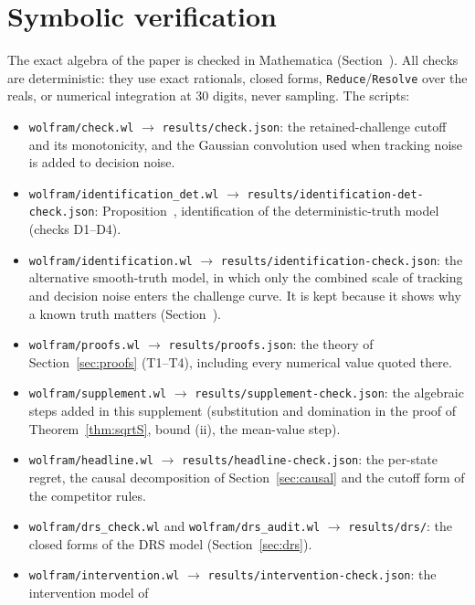 \documentclass[aoas]{imsart}
\theoremstyle{plain}
\theoremstyle{definition}
\begin{document}
\section{Symbolic verification}\label{sec:kernel}

The exact algebra of the paper is checked in Mathematica (Section~). All checks are deterministic: they use exact rationals, closed forms,
\texttt{Reduce}/\texttt{Resolve} over the reals, or numerical integration at 30 digits, never sampling. The scripts:
\begin{itemize}
\item \nolinkurl{wolfram/check.wl} $\to$ \nolinkurl{results/check.json}: the retained-challenge cutoff and its monotonicity,
and the Gaussian convolution used when tracking noise is added to decision noise.
\item \nolinkurl{wolfram/identification_det.wl} $\to$
\nolinkurl{results/identification-det-check.json}:
Proposition~, identification of the deterministic-truth model (checks D1--D4).
\item \nolinkurl{wolfram/identification.wl} $\to$ \nolinkurl{results/identification-check.json}: the alternative smooth-truth
model, in which only the combined scale of tracking and decision noise enters the challenge curve. It is kept because
it shows why a known truth matters (Section~).
\item \nolinkurl{wolfram/proofs.wl} $\to$ \nolinkurl{results/proofs.json}: the theory of Section~\ref{sec:proofs} (T1--T4),
including every numerical value quoted there.
\item \nolinkurl{wolfram/supplement.wl} $\to$ \nolinkurl{results/supplement-check.json}: the algebraic steps added in this
supplement (substitution and domination in the proof of Theorem~\ref{thm:sqrtS}, bound (ii), the mean-value step).
\item \nolinkurl{wolfram/headline.wl} $\to$ \nolinkurl{results/headline-check.json}: the per-state regret, the causal
decomposition of Section~\ref{sec:causal} and the cutoff form of the competitor rules.
\item \nolinkurl{wolfram/drs_check.wl} and \nolinkurl{wolfram/drs_audit.wl} $\to$ \nolinkurl{results/drs/}: the closed forms
of the DRS model (Section~\ref{sec:drs}).
\item \nolinkurl{wolfram/intervention.wl} $\to$ \nolinkurl{results/intervention-check.json}: the intervention model of

\end{itemize}
\end{document}
